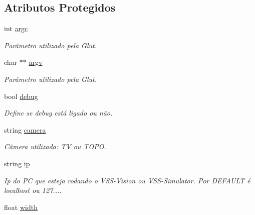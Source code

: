 \subsection*{Atributos Protegidos}
\begin{DoxyCompactItemize}
\item 
int \hyperlink{classGraphics_a1b1e8eba7ed4e60d78d785e70765fef6}{argc}\hypertarget{classGraphics_a1b1e8eba7ed4e60d78d785e70765fef6}{}\label{classGraphics_a1b1e8eba7ed4e60d78d785e70765fef6}

\begin{DoxyCompactList}\small\item\em Parâmetro utilizado pela Glut. \end{DoxyCompactList}\item 
char $\ast$$\ast$ \hyperlink{classGraphics_aca7bf0128e62af000265c0e66ed5e7e1}{argv}\hypertarget{classGraphics_aca7bf0128e62af000265c0e66ed5e7e1}{}\label{classGraphics_aca7bf0128e62af000265c0e66ed5e7e1}

\begin{DoxyCompactList}\small\item\em Parâmetro utilizado pela Glut. \end{DoxyCompactList}\item 
bool \hyperlink{classGraphics_a16b588a2b580e104d18c347f8318e3bd}{debug}\hypertarget{classGraphics_a16b588a2b580e104d18c347f8318e3bd}{}\label{classGraphics_a16b588a2b580e104d18c347f8318e3bd}

\begin{DoxyCompactList}\small\item\em Define se debug está ligado ou não. \end{DoxyCompactList}\item 
string \hyperlink{classGraphics_acb397e43edd9c7d6de193bbb9ff55b94}{camera}\hypertarget{classGraphics_acb397e43edd9c7d6de193bbb9ff55b94}{}\label{classGraphics_acb397e43edd9c7d6de193bbb9ff55b94}

\begin{DoxyCompactList}\small\item\em Câmera utilizada\+: TV ou T\+O\+PO. \end{DoxyCompactList}\item 
string \hyperlink{classGraphics_ad5daf3bff501ac78b1507a8df1534423}{ip}\hypertarget{classGraphics_ad5daf3bff501ac78b1507a8df1534423}{}\label{classGraphics_ad5daf3bff501ac78b1507a8df1534423}

\begin{DoxyCompactList}\small\item\em Ip do PC que esteja rodando o V\+S\+S-\/\+Vision ou V\+S\+S-\/\+Simulator. Por D\+E\+F\+A\+U\+LT é localhost ou 127.... \end{DoxyCompactList}\item 
float \hyperlink{classGraphics_a5b0018455ff1e2ab3d43d1446cfdfe4d}{width}\hypertarget{classGraphics_a5b0018455ff1e2ab3d43d1446cfdfe4d}{}\label{classGraphics_a5b0018455ff1e2ab3d43d1446cfdfe4d}


\end{DoxyCompactItemize}
